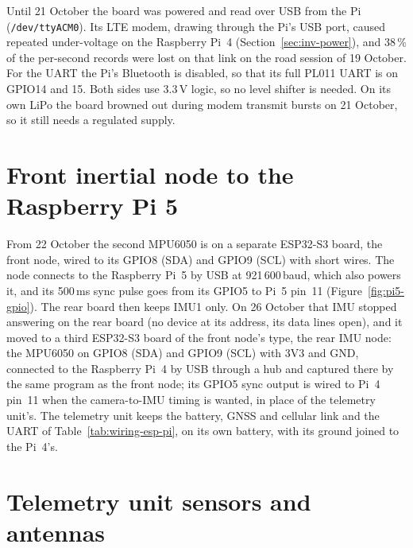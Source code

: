Until 21 October the board was powered and read over USB from the Pi (\texttt{/dev/ttyACM0}). Its LTE modem, drawing through the Pi's USB port, caused repeated under-voltage on the Raspberry Pi~4 (Section~\ref{sec:inv-power}), and 38\,\% of the per-second records were lost on that link on the road session of 19 October. For the UART the Pi's Bluetooth is disabled, so that its full PL011 UART is on GPIO14 and 15. Both sides use 3.3\,V logic, so no level shifter is needed. On its own LiPo the board browned out during modem transmit bursts on 21 October, so it still needs a regulated supply.

\section{Front inertial node to the Raspberry Pi 5}

From 22 October the second MPU6050 is on a separate ESP32-S3 board, the front node, wired to its GPIO8 (SDA) and GPIO9 (SCL) with short wires. The node connects to the Raspberry Pi~5 by USB at 921\,600\,baud, which also powers it, and its 500\,ms sync pulse goes from its GPIO5 to Pi~5 pin~11 (Figure~\ref{fig:pi5-gpio}). The rear board then keeps IMU1 only. On 26 October that IMU stopped answering on the rear board (no device at its address, its data lines open), and it moved to a third ESP32-S3 board of the front node's type, the rear IMU node: the MPU6050 on GPIO8 (SDA) and GPIO9 (SCL) with 3V3 and GND, connected to the Raspberry Pi~4 by USB through a hub and captured there by the same program as the front node; its GPIO5 sync output is wired to Pi~4 pin~11 when the camera-to-IMU timing is wanted, in place of the telemetry unit's. The telemetry unit keeps the battery, GNSS and cellular link and the UART of Table~\ref{tab:wiring-esp-pi}, on its own battery, with its ground joined to the Pi~4's.

\section{Telemetry unit sensors and antennas}

